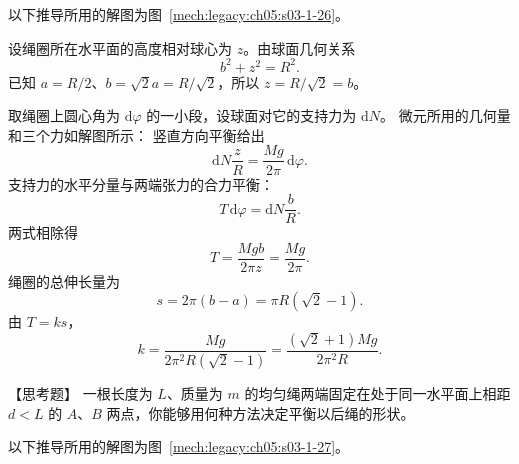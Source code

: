 {\begin{xesolution}
以下推导所用的解图为图~\ref{mech:legacy:ch05:s03-1-26}。

设绳圈所在水平面的高度相对球心为 $z$。由球面几何关系
\[
  b^2+z^2=R^2.
\]
已知 $a=R/2$、$b=\sqrt2a=R/\sqrt2$，所以 $z=R/\sqrt2=b$。

取绳圈上圆心角为 $\mathrm d\varphi$ 的一小段，设球面对它的支持力为 $\mathrm dN$。
微元所用的几何量和三个力如解图所示：
\soldiagOneTwentySix
竖直方向平衡给出
\[
  \mathrm dN\frac zR=\frac{Mg}{2\pi}\,\mathrm d\varphi.
\]
支持力的水平分量与两端张力的合力平衡：
\[
  T\,\mathrm d\varphi=\mathrm dN\frac bR.
\]
两式相除得
\[
  T=\frac{Mgb}{2\pi z}=\frac{Mg}{2\pi}.
\]
绳圈的总伸长量为
\[
  s=2\pi(b-a)=\pi R(\sqrt2-1).
\]
由 $T=ks$，
\[
  \boxed{k=\frac{Mg}{2\pi^2R(\sqrt2-1)}
  =\frac{(\sqrt2+1)Mg}{2\pi^2R}}.
\]
\end{xesolution}

\begin{origexamplebox}{【思考题】}\label{ch05:ex:s03-1-27}
一根长度为 $L$、质量为 $m$ 的均匀绳两端固定在处于同一水平面上相距
$d<L$ 的 $A$、$B$ 两点，你能够用何种方法决定平衡以后绳的形状。
\end{origexamplebox}

\begin{xesolution}
以下推导所用的解图为图~\ref{mech:legacy:ch05:s03-1-27}。


\end{xesolution}}
